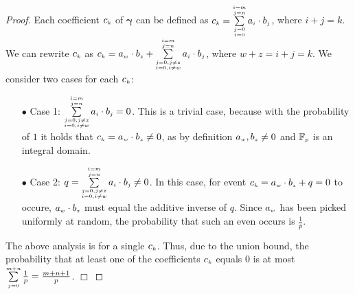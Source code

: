 \begin{proof}
Each coefficient $c_{\scriptscriptstyle  k}$ of $\bm\gamma$ can be defined as $c_{\scriptscriptstyle  k}=\sum\limits_{\substack{\scriptscriptstyle j=0\\ \scriptscriptstyle i=0}}^{\substack{\scriptscriptstyle i=m\\ \scriptscriptstyle j=n}}a_{\scriptscriptstyle i}\cdot b_{\scriptscriptstyle j}$, where $i+j=k$. We can rewrite $c_{\scriptscriptstyle  k}$ as  $c_{\scriptscriptstyle  k}=a_{\scriptscriptstyle w}\cdot b_{\scriptscriptstyle z}+ \sum\limits_{\substack{\scriptscriptstyle j=0, j\neq z\\ \scriptscriptstyle i=0, i\neq w}}^{\substack{\scriptscriptstyle i=m\\ \scriptscriptstyle j=n}}a_{\scriptscriptstyle i}\cdot b_{\scriptscriptstyle j}$, where $w+z=i+j=k$. 
%
We consider two cases for each $c_{\scriptscriptstyle  k}$:

\begin{itemize}

\item[$\bullet$]  {Case 1}: $\sum\limits_{\substack{\scriptscriptstyle j=0, j\neq z\\ \scriptscriptstyle i=0, i\neq w}}^{\substack{\scriptscriptstyle i=m\\ \scriptscriptstyle j=n}}a_{\scriptscriptstyle i}\cdot b_{\scriptscriptstyle j}=0$.  This is a trivial case, because with the  probability of $1$ it holds that $c_{\scriptscriptstyle  k}=a_{\scriptscriptstyle w}\cdot b_{\scriptscriptstyle z}\neq 0$, as by  definition $a_{\scriptscriptstyle w}, b_{\scriptscriptstyle z}\neq0$ and $\mathbb{F}_{\scriptscriptstyle p}$ is an integral domain. 


%




\item[$\bullet$]  {Case 2}: $q=\sum\limits_{\substack{\scriptscriptstyle j=0, j\neq z\\ \scriptscriptstyle i=0, i\neq w}}^{\substack{\scriptscriptstyle i=m\\ \scriptscriptstyle j=n}}a_{\scriptscriptstyle i}\cdot b_{\scriptscriptstyle j}\neq 0$. In this case, for  event $c_{\scriptscriptstyle  k}=a_{\scriptscriptstyle w}\cdot b_{\scriptscriptstyle z}+q=0$ to occure, $a_{\scriptscriptstyle w}\cdot b_{\scriptscriptstyle z}$ must equal the additive inverse of $q$. Since $a_{\scriptscriptstyle w}$ has been picked uniformly at random, the probability that such an even occurs is $\frac{1}{p}$.
\end{itemize}

The above analysis is for a single $c_{\scriptscriptstyle  k}$. Thus, due to the union bound, the probability that at least one of the coefficients $c_{\scriptscriptstyle  k}$ equals $0$ is at most $\sum\limits^{\scriptscriptstyle m+n}_{\scriptscriptstyle j=0}\frac{1}{p}= \frac{m+n+1}{p}$.
%
 \hfill\(\Box\)\end{proof}




